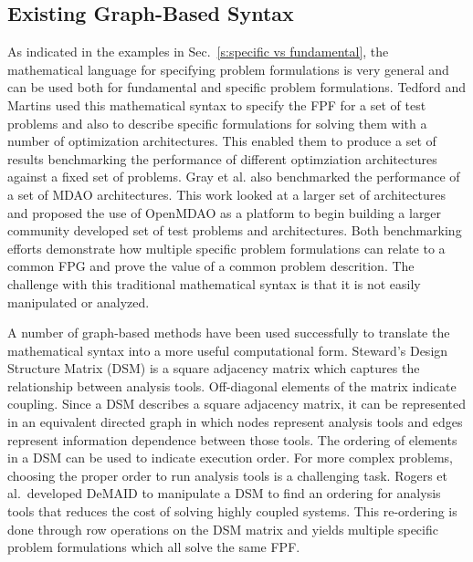 \subsection{Existing Graph-Based Syntax}
	\label{s:existing syntax}
    As indicated in the examples in Sec.~\ref{s:specific vs fundamental}, the mathematical 
    language for specifying problem formulations is very general and can be used both for 
    fundamental and specific problem formulations. Tedford and Martins used this mathematical syntax to specify the 
    FPF for a set of test problems and also to describe specific formulations for solving them with a 
    number of optimization architectures\cite{Tedford2009}. This enabled them to produce a set of 
    results benchmarking the performance of different optimziation architectures against a fixed set of 
    problems. Gray et al. also benchmarked the performance of a set of MDAO architectures\cite{Gray2013}. 
    This work looked at a larger set of architectures and proposed the use of OpenMDAO as a platform to begin 
    building a larger community developed set of test problems and architectures. Both benchmarking efforts 
    demonstrate how multiple specific problem formulations can relate to a common FPG and prove the 
    value of a common problem descrition. The challenge with this 
    traditional mathematical syntax is that it is not easily manipulated or analyzed. 

    A number of graph-based methods have been used successfully to translate the 
    mathematical syntax into a more useful computational form. 
    Steward's Design Structure Matrix (DSM) is a square adjacency matrix which captures the relationship between analysis tools.
    Off-diagonal elements of the matrix indicate coupling\cite{Steward1981}. Since a DSM describes a square adjacency matrix, 
    it can be represented in an equivalent directed graph in which nodes represent analysis tools and 
    edges represent information dependence between those tools. The ordering of elements in a DSM can be used to indicate 
    execution order.  For more complex problems, choosing the proper order to run analysis tools is a challenging task. 
    Rogers et al.~developed DeMAID to manipulate a DSM to find an ordering for analysis tools that 
    reduces the cost of solving highly coupled systems\cite{rogers1996,rogers1996demaid}. This re-ordering is done through 
    row operations on the DSM matrix and yields multiple specific problem 
    formulations which all solve the same FPF. 
    
